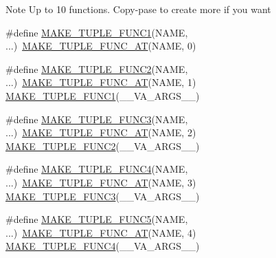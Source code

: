 \begin{DoxyNote}{Note}
Up to 10 functions. Copy-\/pase to create more if you want 
\end{DoxyNote}
\begin{DoxyCompactItemize}
\item 
\#define \hyperlink{group__NamedTupleGroup_gac79e022c5b82df017688d2f0b88cf42e}{M\+A\+K\+E\+\_\+\+T\+U\+P\+L\+E\+\_\+\+F\+U\+N\+C1}(N\+A\+ME, ...)~\hyperlink{group__NamedTupleGroup_ga5563afddd885651b3122846917c2ccb9}{M\+A\+K\+E\+\_\+\+T\+U\+P\+L\+E\+\_\+\+F\+U\+N\+C\+\_\+\+AT}(N\+A\+ME, 0)
\item 
\#define \hyperlink{group__NamedTupleGroup_gab83c856ef87a227f8a29afc3333fd6ec}{M\+A\+K\+E\+\_\+\+T\+U\+P\+L\+E\+\_\+\+F\+U\+N\+C2}(N\+A\+ME, ...)~\hyperlink{group__NamedTupleGroup_ga5563afddd885651b3122846917c2ccb9}{M\+A\+K\+E\+\_\+\+T\+U\+P\+L\+E\+\_\+\+F\+U\+N\+C\+\_\+\+AT}(N\+A\+ME, 1)  \hyperlink{group__NamedTupleGroup_gac79e022c5b82df017688d2f0b88cf42e}{M\+A\+K\+E\+\_\+\+T\+U\+P\+L\+E\+\_\+\+F\+U\+N\+C1}(\+\_\+\+\_\+\+V\+A\+\_\+\+A\+R\+G\+S\+\_\+\+\_\+)
\item 
\#define \hyperlink{group__NamedTupleGroup_ga7e4144de9ffdac9df5266b4028136d60}{M\+A\+K\+E\+\_\+\+T\+U\+P\+L\+E\+\_\+\+F\+U\+N\+C3}(N\+A\+ME, ...)~\hyperlink{group__NamedTupleGroup_ga5563afddd885651b3122846917c2ccb9}{M\+A\+K\+E\+\_\+\+T\+U\+P\+L\+E\+\_\+\+F\+U\+N\+C\+\_\+\+AT}(N\+A\+ME, 2)  \hyperlink{group__NamedTupleGroup_gab83c856ef87a227f8a29afc3333fd6ec}{M\+A\+K\+E\+\_\+\+T\+U\+P\+L\+E\+\_\+\+F\+U\+N\+C2}(\+\_\+\+\_\+\+V\+A\+\_\+\+A\+R\+G\+S\+\_\+\+\_\+)
\item 
\#define \hyperlink{group__NamedTupleGroup_gab45873cb40b1944b49884da4c0776832}{M\+A\+K\+E\+\_\+\+T\+U\+P\+L\+E\+\_\+\+F\+U\+N\+C4}(N\+A\+ME, ...)~\hyperlink{group__NamedTupleGroup_ga5563afddd885651b3122846917c2ccb9}{M\+A\+K\+E\+\_\+\+T\+U\+P\+L\+E\+\_\+\+F\+U\+N\+C\+\_\+\+AT}(N\+A\+ME, 3)  \hyperlink{group__NamedTupleGroup_ga7e4144de9ffdac9df5266b4028136d60}{M\+A\+K\+E\+\_\+\+T\+U\+P\+L\+E\+\_\+\+F\+U\+N\+C3}(\+\_\+\+\_\+\+V\+A\+\_\+\+A\+R\+G\+S\+\_\+\+\_\+)
\item 
\#define \hyperlink{group__NamedTupleGroup_ga2e81cdfdbe7b7e8993798c0ac0d03de8}{M\+A\+K\+E\+\_\+\+T\+U\+P\+L\+E\+\_\+\+F\+U\+N\+C5}(N\+A\+ME, ...)~\hyperlink{group__NamedTupleGroup_ga5563afddd885651b3122846917c2ccb9}{M\+A\+K\+E\+\_\+\+T\+U\+P\+L\+E\+\_\+\+F\+U\+N\+C\+\_\+\+AT}(N\+A\+ME, 4)  \hyperlink{group__NamedTupleGroup_gab45873cb40b1944b49884da4c0776832}{M\+A\+K\+E\+\_\+\+T\+U\+P\+L\+E\+\_\+\+F\+U\+N\+C4}(\+\_\+\+\_\+\+V\+A\+\_\+\+A\+R\+G\+S\+\_\+\+\_\+)

\end{DoxyCompactItemize}
